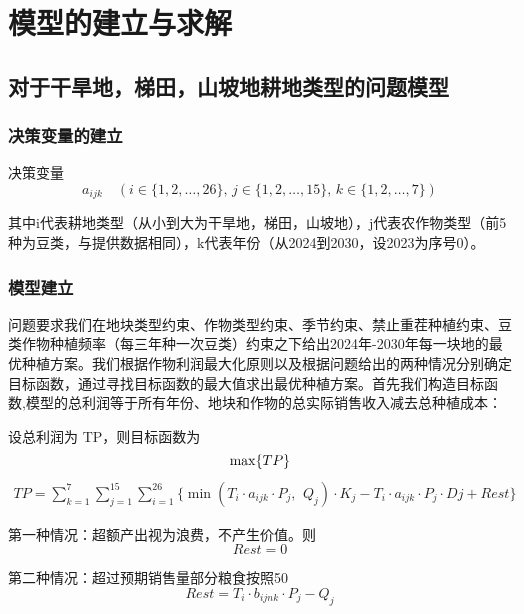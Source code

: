 \documentclass[a4paper]{article}
\begin{document}
	
	
	
	\section{模型的建立与求解}
	\subsection{对于干旱地，梯田，山坡地耕地类型的问题模型}
	\subsubsection{决策变量的建立}
	决策变量 
	\begin{equation*}
		a_{ijk} \quad (i \in \{1, 2, \dots, 26\}, \, j \in \{1, 2, \dots, 15\}, \, k \in \{1, 2, \dots, 7\})
	\end{equation*}
	
	其中i代表耕地类型（从小到大为干旱地，梯田，山坡地），j代表农作物类型（前5种为豆类，与提供数据相同），k代表年份（从2024到2030，设2023为序号0）。
	
	\subsubsection{模型建立}
	问题要求我们在地块类型约束、作物类型约束、季节约束、禁止重茬种植约束、豆类作物种植频率（每三年种一次豆类）约束之下给出2024年-2030年每一块地的最优种植方案。我们根据作物利润最大化原则以及根据问题给出的两种情况分别确定目标函数，通过寻找目标函数的最大值求出最优种植方案。首先我们构造目标函数,模型的总利润等于所有年份、地块和作物的总实际销售收入减去总种植成本：
	
	设总利润为 TP，则目标函数为
	\begin{equation*}
		\max\{TP\} \\
	\end{equation*}	
	\begin{align*}	
		TP =\sum_{k = 1}^{7}\sum_{j = 1}^{15} \sum_{i = 1}^{26} \{ \min(T_i \cdot a_{ijk} \cdot P_j \text{, } \  Q_j) \cdot K_j - T_i \cdot a_{ijk} \cdot P_j \cdot Dj + Rest\}
	\end{align*}
	
	第一种情况：超额产出视为浪费，不产生价值。则
	\begin{equation*}
		Rest = 0
	\end{equation*}	 \par
	
	第二种情况：超过预期销售量部分粮食按照50%
	\begin{equation*}
		Rest = T_i \cdot b_{ijnk} \cdot P_j - Q_j
	\end{equation*}	
	 
\end{document}
